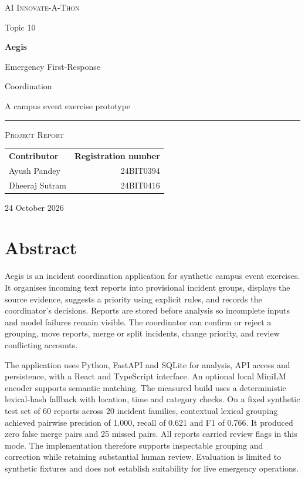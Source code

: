 \documentclass[11pt,a4paper]{article}
\begin{document}
\hypersetup{pageanchor=false}
\begin{titlepage}
\centering
\vspace*{18mm}
{\large\scshape AI Innovate-A-Thon\par}
\vspace{6mm}
{\normalsize Topic 10\par}
\vspace{28mm}
{\fontsize{42}{48}\selectfont\bfseries Aegis\par}
\vspace{8mm}
{\LARGE Emergency First-Response\par Coordination\par}
\vspace{9mm}
{\large A campus event exercise prototype\par}
\vspace{14mm}
\rule{0.72\textwidth}{0.5pt}\par
\vspace{10mm}
{\large\scshape Project Report\par}
\vfill
\begin{tabular}{lr}
\textbf{Contributor} & \textbf{Registration number} \\
\addlinespace[3pt]
Ayush Pandey & 24BIT0394 \\
Dheeraj Sutram & 24BIT0416 \\
\end{tabular}
\vspace{20mm}

{\normalsize 24 October 2026\par}
\vspace*{10mm}
\end{titlepage}

\hypersetup{pageanchor=true}
\section*{Abstract}
Aegis is an incident coordination application for synthetic campus event exercises. It organises incoming text reports into provisional incident groups, displays the source evidence, suggests a priority using explicit rules, and records the coordinator's decisions. Reports are stored before analysis so incomplete inputs and model failures remain visible. The coordinator can confirm or reject a grouping, move reports, merge or split incidents, change priority, and review conflicting accounts.

The application uses Python, FastAPI and SQLite for analysis, API access and persistence, with a React and TypeScript interface. An optional local MiniLM encoder supports semantic matching. The measured build uses a deterministic lexical-hash fallback with location, time and category checks. On a fixed synthetic test set of 60 reports across 20 incident families, contextual lexical grouping achieved pairwise precision of 1.000, recall of 0.621 and F1 of 0.766. It produced zero false merge pairs and 25 missed pairs. All reports carried review flags in this mode. The implementation therefore supports inspectable grouping and correction while retaining substantial human review. Evaluation is limited to synthetic fixtures and does not establish suitability for live emergency operations.
\end{document}

